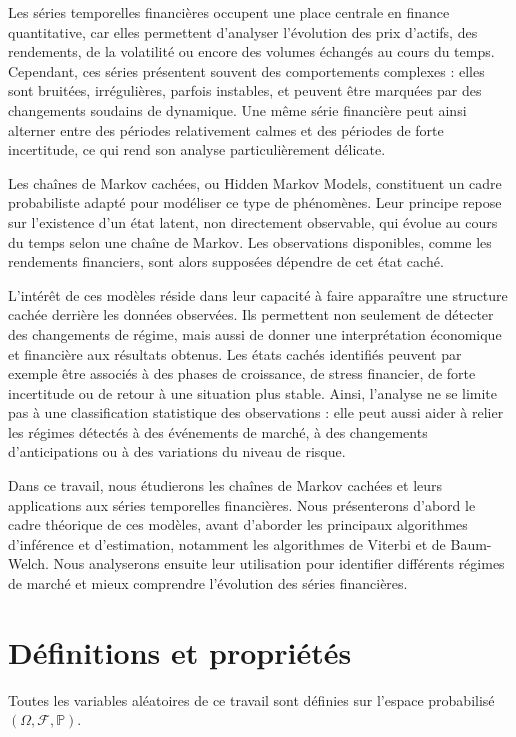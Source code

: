 \documentclass[11pt]{article}
\begin{document}
Les séries temporelles financières occupent une place centrale en finance quantitative, car elles permettent d’analyser l’évolution des prix d’actifs, des rendements, de la volatilité ou encore des volumes échangés au cours du temps. Cependant, ces séries présentent souvent des comportements complexes : elles sont bruitées, irrégulières, parfois instables, et peuvent être marquées par des changements soudains de dynamique. Une même série financière peut ainsi alterner entre des périodes relativement calmes et des périodes de forte incertitude, ce qui rend son analyse particulièrement délicate.

Les chaînes de Markov cachées, ou Hidden Markov Models, constituent un cadre probabiliste adapté pour modéliser ce type de phénomènes. Leur principe repose sur l’existence d’un état latent, non directement observable, qui évolue au cours du temps selon une chaîne de Markov. Les observations disponibles, comme les rendements financiers, sont alors supposées dépendre de cet état caché. 

L’intérêt de ces modèles réside dans leur capacité à faire apparaître une structure cachée derrière les données observées. Ils permettent non seulement de détecter des changements de régime, mais aussi de donner une interprétation économique et financière aux résultats obtenus. Les états cachés identifiés peuvent par exemple être associés à des phases de croissance, de stress financier, de forte incertitude ou de retour à une situation plus stable. Ainsi, l’analyse ne se limite pas à une classification statistique des observations : elle peut aussi aider à relier les régimes détectés à des événements de marché, à des changements d’anticipations ou à des variations du niveau de risque.

Dans ce travail, nous étudierons les chaînes de Markov cachées et leurs applications aux séries temporelles financières. Nous présenterons d’abord le cadre théorique de ces modèles, avant d’aborder les principaux algorithmes d’inférence et d’estimation, notamment les algorithmes de Viterbi et de Baum-Welch. Nous analyserons ensuite leur utilisation pour identifier différents régimes de marché et mieux comprendre l’évolution des séries financières.

\newpage

\section{Définitions et propriétés}
Toutes les variables aléatoires de ce travail sont définies sur l'espace probabilisé $(\Omega, \mathcal{F}, \mathbb{P})$.
\end{document}
